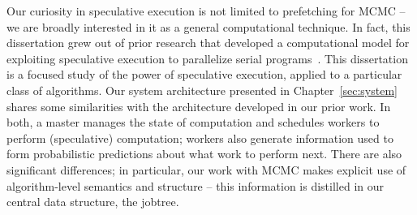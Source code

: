 \documentclass[angelino.tex]{subfiles}
\begin{document}
Our curiosity in speculative execution is not limited to prefetching for MCMC --
we are broadly interested in it as a general computational technique.
%
In fact, this dissertation grew out of prior research that developed a
computational model for exploiting speculative execution to parallelize
serial programs~\citep{waterland:2013-caches,waterland:2014-asc}.
This dissertation is a focused study of the power of speculative execution,
applied to a particular class of algorithms.
%
Our system architecture presented in Chapter~\ref{sec:system} shares some
similarities with the architecture developed in our prior work.
In both, a master manages the state of computation and schedules workers to
perform (speculative) computation; workers also generate information used to
form probabilistic predictions about what work to perform next.
There are also significant differences; in particular, our work with MCMC makes
explicit use of algorithm-level semantics and structure -- this information is
distilled in our central data structure, the jobtree.
\end{document}
